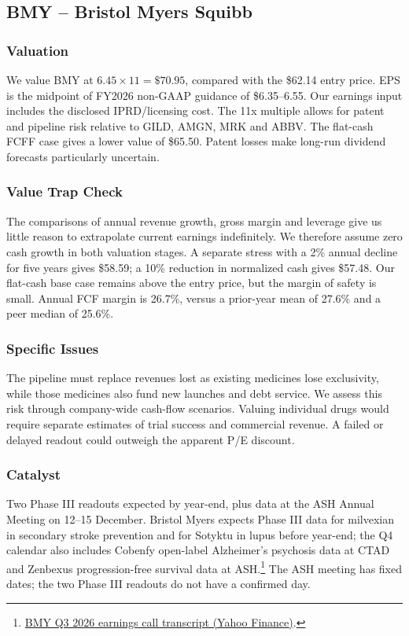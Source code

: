 \documentclass[10pt,a4paper]{article}
\begin{document}
\subsection{BMY -- Bristol Myers Squibb}

\subsubsection*{Valuation}
We value BMY at $6.45\times11=\$70.95$, compared with the \$62.14 entry price. EPS is the midpoint of FY2026 non-GAAP guidance of \$6.35--6.55. Our earnings input includes the disclosed IPRD/licensing cost. The 11x multiple allows for patent and pipeline risk relative to GILD, AMGN, MRK and ABBV. The flat-cash FCFF case gives a lower value of \$65.50. Patent losses make long-run dividend forecasts particularly uncertain.

\subsubsection*{Value Trap Check}
The comparisons of annual revenue growth, gross margin and leverage give us little reason to extrapolate current earnings indefinitely. We therefore assume zero cash growth in both valuation stages. A separate stress with a 2\% annual decline for five years gives \$58.59; a 10\% reduction in normalized cash gives \$57.48. Our flat-cash base case remains above the entry price, but the margin of safety is small. Annual FCF margin is 26.7\%, versus a prior-year mean of 27.6\% and a peer median of 25.6\%.

\subsubsection*{Specific Issues}
The pipeline must replace revenues lost as existing medicines lose exclusivity, while those medicines also fund new launches and debt service. We assess this risk through company-wide cash-flow scenarios. Valuing individual drugs would require separate estimates of trial success and commercial revenue. A failed or delayed readout could outweigh the apparent P/E discount.

\subsubsection*{Catalyst}
Two Phase III readouts expected by year-end, plus data at the ASH Annual Meeting on 12--15 December. Bristol Myers expects Phase III data for milvexian in secondary stroke prevention and for Sotyktu in lupus before year-end; the Q4 calendar also includes Cobenfy open-label Alzheimer's psychosis data at CTAD and Zenbexus progression-free survival data at ASH.\footnote{\href{https://finance.yahoo.com/quote/BMY/earnings/BMY-Q3-2026-earnings_call-660055.html}{BMY Q3 2026 earnings call transcript (Yahoo Finance)}.} The ASH meeting has fixed dates; the two Phase III readouts do not have a confirmed day.
\end{document}
